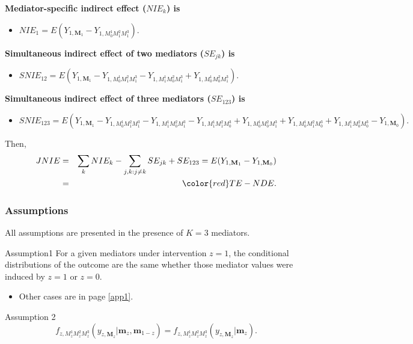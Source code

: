 \documentclass{beamer}
\begin{document}
\begin{frame}

{\bf Mediator-specific indirect effect ($NIE_k$) is}
\begin{itemize}
\item $NIE_1 = E(Y_{1,\mathbf{M}_1} - Y_{1,M_0^1M_1^2M_1^3}).$
\end{itemize} 
\smallskip

{\bf Simultaneous indirect effect of two mediators ($SE_{jk}$) is}
\begin{itemize}
\item 
$SNIE_{12}  =  E(Y_{1,\mathbf{M}_1} - Y_{1,M_0^1M_1^2M_1^3} - Y_{1,M_1^1M_0^2M_1^3} + Y_{1,M_0^1 M_0^2M_1^3}).$
\end{itemize}
\smallskip

{\bf Simultaneous indirect effect of three mediators ($SE_{123}$) is}
\begin{itemize}
\item 
$SNIE_{123}  =  E(Y_{1,\mathbf{M}_1}-Y_{1,M_0^1M_1^2M_1^3}-Y_{1,M_1^1M_0^2M_1^3}-Y_{1,M_1^1M_1^2M_0^3}+Y_{1,M_0^1 M_0^2M_1^3}+Y_{1,M_0^1M_1^2 M_0^3}+Y_{1,M_1^1M_0^2 M_0^3}-Y_{1,\mathbf{M}_0}).$

\end{itemize}
\bigskip

Then, 
\begin{eqnarray*}
JNIE & = & \sum_k NIE_k -\sum_{j,k:j \neq k} SE_{jk} + SE_{123} 
 =  E(Y_{1,\mathbf{M}_1}-Y_{1,\mathbf{M}_0})\\
& = & {\color{red} TE -NDE}.
\end{eqnarray*}
\end{frame}


\begin{frame}
\frametitle{Assumptions}
All assumptions are presented in the presence of $K=3$ mediators.
\begin{block}{Assumption1}
For a given mediators under intervention $z=1$, the conditional
distributions of the outcome are the same whether those mediator values
were induced by $z=1$ or $z=0$.
\end{block}
\begin{itemize}
\item
Other cases are in page \ref{app1}.
\end{itemize}
\begin{block}{Assumption 2}
\[f_{z,M_z^1M_z^2M_z^3}(y_{z,\mathbf{M}_z} | \mathbf{m}_z,\mathbf{m}_{1-z}
)=f_{z,M_z^1M_z^2M_z^3}(y_{z,\mathbf{M}_z} | \mathbf{m}_z
).\]
\end{block}
\end{frame}
\end{document}
